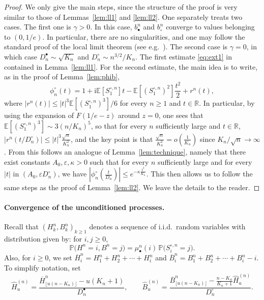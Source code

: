 \documentclass[10pt]{amsart}
\theoremstyle{definition}\newtheorem{defi}[theo]{Definition}\newtheorem{rema}[theo]{Remark}\newtheorem{exam}[theo]{Example}\newtheorem{exem}[theo]{Example}\newtheorem{nota}[theo]{Notation}
\newcommand{\E}{\mathbb{E}}
\newcommand{\R}{\mathbb{R}}
\def\bbn{b_{\bullet}^{n}}
\def\bcn{b_{\circ}^{n}}
\def\mubn{\mu_{\bullet}^{n}}
\def\Scn{S^{\circ,n}}
\def\phicn{\phi^{\circ}_{n}}
\def\Dbn{D^{\bullet}_{n}}
\def\Dcn{D^{\circ}_{n}}
\def\oB{\overline{B}}
\def\hB{\widehat{B}}
\def\oH{\overline{H}}
\def\hH{\widehat{H}}
\renewcommand{\epsilon}{\varepsilon}
\newcommand\Prb[1]{\mathbb{P}\big(#1\big)}
\begin{document}
\begin{proof}
  We only give the main steps, since the structure of the proof is very similar to those of Lemmas~\ref{lem:ll1} and \ref{lem:ll2}. One separately treats two cases. The first one is $\gamma>0$. In this case, $\bbn$ and $\bcn$ converge to values belonging to $(0,1/e)$. In particular, there are no singularities, and one may follow the standard proof of the local limit theorem (see e.g.~\cite[Theorem 3.5.2]{Dur10}). The second case is $\gamma=0$, in which case  $ \Dbn \sim \sqrt{K_{n}}$ and $\Dcn \sim n^{3/2} /K_{n}$. The first estimate \eqref{eq:ext1} in contained in Lemma~\ref{lem:ll1}. For the second estimate, the main idea is to write, as in the proof of Lemma~\ref{lem:phib},
\[\phicn(t)=1+\textrm{i}\E[\Scn_{1}]t- \E[(\Scn_{1})^{2}] \frac{t^{2}}{2}+r^{n}(t),\]
where $|r^{n}(t)| \leq |t|^{3}  \E[(\Scn_{1})^{3}]/6$ for every $n \geq 1$ and $t \in \R$. In particular, by using the expansion of $F(1/e-z)$ around $z=0$, one sees that $ \E[(\Scn_{1})^{3}] \sim 3 (n/K_{n})^{5}$, so that for every $n$ sufficiently large and $t \in \R$, $|r^{n}(t/\Dcn)| \leq |t|^{3} \tfrac{\sqrt{n}}{K_{n}^{2}}$, and the key point is that $ \tfrac{\sqrt{n}}{K_{n}^{2}}= o(\tfrac{1}{K_{n}})$ since $K_{n}/\sqrt{n} \rightarrow \infty$. From this follows an analogue of Lemma~\ref{lem:technique}, namely that there exist constants $A_{0},\epsilon,\kappa>0$ such that  for every $n$ sufficiently large and for every $|t|$ in $(A_{0}, \epsilon \Dcn)$, we have $|\phicn( \tfrac{t}{\Dcn})| \leq e^{- \kappa  \frac{t^{2}}{K_{n}}}$. This then allows us to follow the same steps as the proof of Lemma~\ref{lem:ll2}. We leave the details to the reader.
\end{proof}



\paragraph*{Convergence of the unconditioned processes.}  Recall that $(H^{n}_{k},B^{n}_{k})_{k \geq 1}$ denotes a sequence of i.i.d.~random variables with distribution given by: for $i, j \geq 0$,
\[ \Prb{H^{n}=i,B^{n}=j}=\mubn(i) \,\Prb{\Scn_{i}=j}.\]
Also, for $i \geq 0$, we set  $\oH^{n}_{i}=H^{n}_{1}+H^{n}_{2}+ \cdots+H^{n}_{i}$ and  $\oB^{n}_{i}=B^{n}_{1}+B^{n}_{2}+ \cdots+B^{n}_{i}-i$.
To simplify notation, set \[\hH^{(n)}_{u}=\frac{\oH^{n}_{ \lfloor u (n-K_{n}) \rfloor } - u (K_{n}+1) }{\Dbn}, \qquad \hB^{(n)}_{u}= \frac{\oB^{n}_{ \lfloor u (n-K_{n}) \rfloor }  - \frac{n-K_{n}}{K_{n}+1} \hH^{(n)}_{u}  }{\Dcn}.\]
\end{document}
